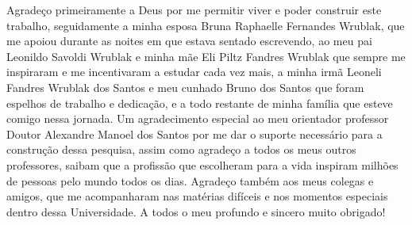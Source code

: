Agradeço primeiramente a Deus por me permitir viver e poder construir este trabalho, seguidamente a minha esposa Bruna Raphaelle Fernandes Wrublak, que me apoiou durante as noites em que estava sentado escrevendo, ao meu pai Leonildo Savoldi Wrublak e minha mãe Eli Piltz Fandres Wrublak que sempre me inspiraram e me incentivaram a estudar cada vez mais, a minha irmã Leoneli Fandres Wrublak dos Santos e meu cunhado Bruno dos Santos que foram espelhos de trabalho e dedicação, e a todo restante de minha família que esteve comigo nessa jornada. Um agradecimento especial ao meu orientador professor Doutor Alexandre Manoel dos Santos por me dar o suporte necessário para a construção dessa pesquisa, assim como agradeço a todos os meus outros professores, saibam que a profissão que escolheram para a vida inspiram milhões de pessoas pelo mundo todos os dias. Agradeço também aos meus colegas e amigos, que me acompanharam nas matérias difíceis e nos momentos especiais dentro dessa Universidade. A todos o meu profundo e sincero muito obrigado!